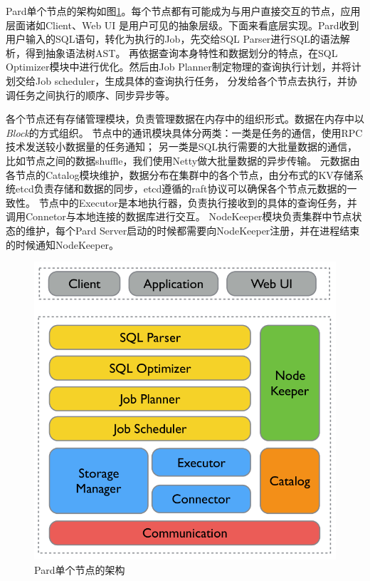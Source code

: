 \documentclass[a4paper, 12pt]{ctexart}
\begin{document}
Pard单个节点的架构如图\ref{fig:node1}。每个节点都有可能成为与用户直接交互的节点，应用层面诸如Client、Web UI
是用户可见的抽象层级。下面来看底层实现。Pard收到用户输入的SQL语句，转化为执行的Job，先交给SQL Parser进行SQL的语法解析，得到抽象语法树AST。
再依据查询本身特性和数据划分的特点，在SQL Optimizer模块中进行优化。然后由Job Planner制定物理的查询执行计划，并将计划交给Job scheduler，生成具体的查询执行任务，
分发给各个节点去执行，并协调任务之间执行的顺序、同步异步等。

各个节点还有存储管理模块，负责管理数据在内存中的组织形式。数据在内存中以\textit{Block}的方式组织。
节点中的通讯模块具体分两类：一类是任务的通信，使用RPC技术发送较小数据量的任务通知；
另一类是SQL执行需要的大批量数据的通信，比如节点之间的数据shuffle，我们使用Netty做大批量数据的异步传输。
元数据由各节点的Catalog模块维护，数据分布在集群中的各个节点，由分布式的KV存储系统etcd负责存储和数据的同步，etcd遵循的raft协议可以确保各个节点元数据的一致性。
节点中的Executor是本地执行器，负责执行接收到的具体的查询任务，并调用Connetor与本地连接的数据库进行交互。
NodeKeeper模块负责集群中节点状态的维护，每个Pard Server启动的时候都需要向NodeKeeper注册，并在进程结束的时候通知NodeKeeper。

\begin{figure}[htbp]
	\centering
	\includegraphics[width=0.7\linewidth]{figure/pard-node-in.png}
	\caption{Pard单个节点的架构}
	\label{fig:node1}
\end{figure}
\end{document}
